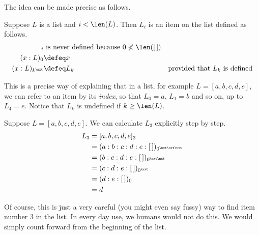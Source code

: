 The idea can be made precise as follows.

\begin{defn}\label{def:ListIndices}
Suppose $L$ is a list and $i<\len(L)$. Then $L_i$ is an item on the list
defined as follows.
\begin{align*}
  [\,]_i &\text{ is never defined because $0\not<\len([\,])$}\\
  (x:L)_0 &\defeq x\\
  (x:L)_{k^\nxt} &\defeq L_k &\text{provided that $L_k$ is defined}
\end{align*}
\end{defn}

This is a precise way of explaining that in a list, for example $L=[a,b,c,d,e]$,
we can refer to an item by its \emph{index}, so that $L_0 = a$, $L_1=b$ and so on,
up to $L_4 = e$. Notice that $L_k$ is undefined if $k\geq \len(L)$.

\ipadbreak

\begin{example}
Suppose $L=[a,b,c,d,e]$. We can calculate $L_3$ 
explicitly step by step.
\begin{align*}
L_3 &= [a,b,c,d,e]_3\\
    &= (a:b:c:d:e:[\,])_{0^{\nxt\nxt\nxt}}\\
    &= (b:c:d:e:[\,])_{0^{\nxt\nxt}}\\
    &= (c:d:e:[\,])_{0^\nxt}\\
    &= (d:e:[\,])_0\\
    &= d
\end{align*}

Of course, this is just a very careful (you might even say fussy) way to find item number $3$ in the list. In every day use, we humans would not do this. We would simply count forward
from the beginning of the list.

\end{example}

\ipadbreak


